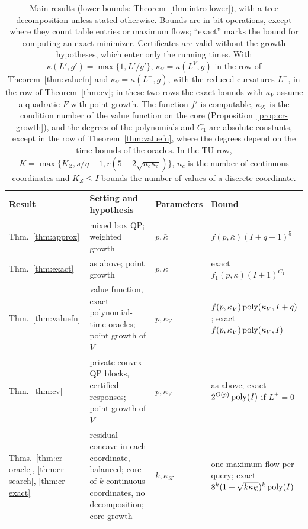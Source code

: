 \begin{table}[tb]
\centering
\small
\setlength{\tabcolsep}{2.5pt}
\caption{Main results (lower bounds: Theorem~\ref{thm:intro-lower}), with a
tree decomposition unless stated otherwise. Bounds are in bit operations,
except where they count table entries or maximum flows; ``exact'' marks the
bound for computing an exact minimizer. Certificates are valid without the
growth hypotheses, which enter only the running times. With
$\kappa(L',g')=\max\{1,L'/g'\}$, $\kappa_V=\kappa(L^V,g)$ in the row of
Theorem~\ref{thm:valuefn} and $\kappa_V=\kappa(L^+,g)$, with the reduced
curvatures $L^+$, in the row of Theorem~\ref{thm:cv}; in these two rows the
exact bounds with $\kappa_V$ assume a quadratic $F$ with point growth. The
function $f'$ is computable, $\kappa_{\mathcal K}$ is the condition number of
the value function on the core (Proposition~\ref{prop:cr-growth}), and the
degrees of the polynomials and $C_1$ are absolute constants, except in the
row of Theorem~\ref{thm:valuefn}, where the degrees depend on the time bounds
of the oracles. In the TU row,
$K=\max\{K_Z,s/\eta+1,r(5+2\sqrt{n_c\kappa_c})\}$, $n_c$ is the number of
continuous coordinates and $K_Z\le I$ bounds the number of values of a
discrete coordinate.}\label{tab:results}
\begin{tabular}{@{}>{\raggedright\arraybackslash}p{2.0cm}
>{\raggedright\arraybackslash}p{6.2cm}
>{\raggedright\arraybackslash}p{1.8cm}
>{\raggedright\arraybackslash}p{5.9cm}@{}}
\toprule
Result & Setting and hypothesis & Parameters & Bound\\
\midrule
Thm.~\ref{thm:approx} & mixed box QP; weighted growth &
$p,\bar\kappa$ & $f(p,\bar\kappa)(I+q+1)^5$\\
Thm.~\ref{thm:exact} & as above; point growth & $p,\kappa$ & exact
$f_1(p,\kappa)(I+1)^{C_1}$\\
Thm.~\ref{thm:valuefn} & value function, exact polynomial-time oracles;
point growth of $V$ & $p,\kappa_V$ &
$f(p,\kappa_V)\operatorname{poly}(\kappa_V,I+q)$; exact $f(p,\kappa_V)\operatorname{poly}(\kappa_V,I)$\\
Thm.~\ref{thm:cv} & private convex QP blocks, certified responses; point
growth of $V$ & $p,\kappa_V$ & as above; exact $2^{O(p)}\operatorname{poly}(I)$ if
$L^+=0$\\
Thms.~\ref{thm:cr-oracle}, \ref{thm:cr-search}, \ref{thm:cr-exact} &
residual concave in each coordinate, balanced; core of $k$ continuous
coordinates, no decomposition; core growth & $k,\kappa_{\mathcal K}$ & one maximum flow per
query; exact $8^k(1+\sqrt{k\kappa_{\mathcal K}})^k\operatorname{poly}(I)$\\

\end{tabular}
\end{table}
